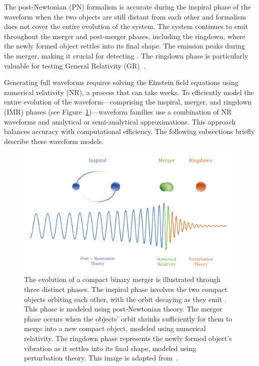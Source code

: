 The post-Newtonian (PN) formalism is accurate during the inspiral phase of the waveform when the two objects are still distant from each other and formalism does not cover the entire evolution of the system. The system continues to emit \gws throughout the merger and post-merger phases, including the ringdown, where the newly formed object settles into its final shape. The \gwadj emission peaks during the merger, making it crucial for detecting \gws. The ringdown phase is particularly valuable for testing General Relativity (GR)~\cite{GW150914_TGR:2016, GW170817_TGR:2019, O3_TGR:2021}.

Generating full waveforms requires solving the Einstein field equations using numerical relativity (NR), a process that can take weeks. To efficiently model the entire evolution of the waveform---comprising the inspiral, merger, and ringdown (IMR) phases (see Figure~\ref{1:fig:IMR})---waveform families use a combination of NR waveforms and analytical or semi-analytical approximations. This approach balances accuracy with computational efficiency. The following subsections briefly describe these waveform models.

\begin{figure}
    \centering
    \includegraphics[width=1.0\linewidth]{images/1_general_relativity/modelling_cbc/IMR.pdf}
    \caption{The evolution of a compact binary merger is illustrated through three distinct phases. The inspiral phase involves the two compact objects orbiting each other, with the orbit decaying as they emit \gws. This phase is modeled using post-Newtonian theory. The merger phase occurs when the objects' orbit shrinks sufficiently for them to merge into a new compact object, modeled using numerical relativity. The ringdown phase represents the newly formed object's vibration as it settles into its final shape, modeled using perturbation theory. This image is adapted from~\cite{IMR_plot:2016}.}
    \label{1:fig:IMR}
\end{figure}

